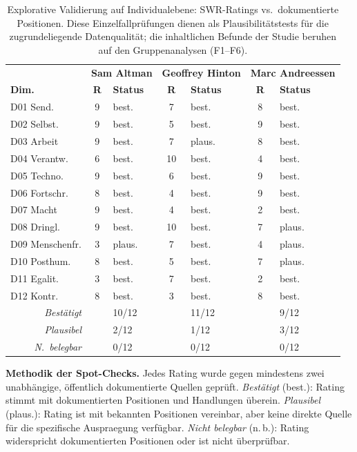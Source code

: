\documentclass[12pt,a4paper]{article}
\begin{document}
\begin{table}[htbp]
  \centering
  \caption{Explorative Validierung auf Individualebene: SWR-Ratings vs.\ dokumentierte Positionen. Diese Einzelfallprüfungen dienen als Plausibilitätstests für die zugrundeliegende Datenqualität; die inhaltlichen Befunde der Studie beruhen auf den Gruppenanalysen (F1--F6).}
  \label{tab:spotchecks}
  \footnotesize
  \begin{tabular}{l c l c l c l}
    \toprule
    & \multicolumn{2}{c}{\textbf{Sam Altman}} & \multicolumn{2}{c}{\textbf{Geoffrey Hinton}} & \multicolumn{2}{c}{\textbf{Marc Andreessen}} \\
    \textbf{Dim.} & \textbf{R} & \textbf{Status} & \textbf{R} & \textbf{Status} & \textbf{R} & \textbf{Status} \\
    \midrule
    D01 Send. & 9 & best. & 7 & best. & 8 & best. \\
    D02 Selbst. & 9 & best. & 5 & best. & 9 & best. \\
    D03 Arbeit & 9 & best. & 7 & plaus. & 8 & best. \\
    D04 Verantw. & 6 & best. & 10 & best. & 4 & best. \\
    \addlinespace[3pt]
    D05 Techno. & 9 & best. & 6 & best. & 9 & best. \\
    D06 Fortschr. & 8 & best. & 4 & best. & 9 & best. \\
    D07 Macht & 9 & best. & 4 & best. & 2 & best. \\
    D08 Dringl. & 9 & best. & 10 & best. & 7 & plaus. \\
    \addlinespace[3pt]
    D09 Menschenfr. & 3 & plaus. & 7 & best. & 4 & plaus. \\
    D10 Posthum. & 8 & best. & 5 & best. & 7 & plaus. \\
    D11 Egalit. & 3 & best. & 7 & best. & 2 & best. \\
    D12 Kontr. & 8 & best. & 3 & best. & 8 & best. \\
    \midrule
    \multicolumn{1}{r}{\textit{Bestätigt}} & & 10/12 & & 11/12 & & 9/12 \\
    \multicolumn{1}{r}{\textit{Plausibel}} & & 2/12 & & 1/12 & & 3/12 \\
    \multicolumn{1}{r}{\textit{N.\ belegbar}} & & 0/12 & & 0/12 & & 0/12 \\
    \bottomrule
  \end{tabular}
\end{table}

\noindent\textbf{Methodik der Spot-Checks.} Jedes Rating wurde gegen mindestens zwei unabhängige, öffentlich dokumentierte Quellen geprüft. \emph{Bestätigt} (best.): Rating stimmt mit dokumentierten Positionen und Handlungen überein. \emph{Plausibel} (plaus.): Rating ist mit bekannten Positionen vereinbar, aber keine direkte Quelle für die spezifische Ausprae\-gung verfügbar. \emph{Nicht belegbar} (n.\,b.): Rating widerspricht dokumentierten Positionen oder ist nicht überprüfbar.
\end{document}
